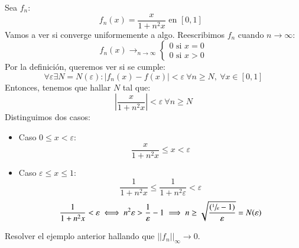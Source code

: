 \begin{eg}
    Sea $f_n$:
    $$
        f_n(x) = \frac{x}{1+n^2x} \text{ en $[0,1]$ }
    $$
    Vamos a ver si converge uniformemente a algo.
    Reescribimos $f_n$ cuando $n \to \infty$:
    $$
        f_n(x) \to_{n \to \infty}
        \begin{cases}
            0 \text{ si } x = 0\\
            0 \text{ si } x > 0
        \end{cases}
    $$
    Por la definición, queremos ver si se cumple:
    $$
        \forall \varepsilon \exists N=N(\varepsilon) : |f_n(x) - f(x)| < \varepsilon\ \forall n \geq N,\ \forall x \in [0,1]
    $$
    Entonces, tenemos que hallar $N$ tal que:
    $$
        \left|  \frac{x}{1+n^2x} \right| < \varepsilon\ \forall n \geq N
    $$
    Distinguimos dos casos:
    \begin{itemize}
        \item Caso $0 \leq x < \varepsilon$:
        $$
            \frac{x}{1+n^2x} \leq x < \varepsilon
        $$
        \item Caso $\varepsilon \leq x \leq 1$:
        $$
            \frac{1}{1+n^2x} \leq \frac{1}{1+n^2\varepsilon} < \varepsilon
        $$
        $$
            \frac{1}{1+n^2x} < \varepsilon \iff n^2\varepsilon > \frac{1}{\varepsilon} - 1 \implies n \geq \sqrt{\frac{(\sfrac{1}{\varepsilon} - 1)}{\varepsilon}} = N(\varepsilon)
        $$
    \end{itemize}
\end{eg}

\begin{th_ex}
    Resolver el ejemplo anterior hallando que $||f_n||_\infty \to 0$.
\end{th_ex}

